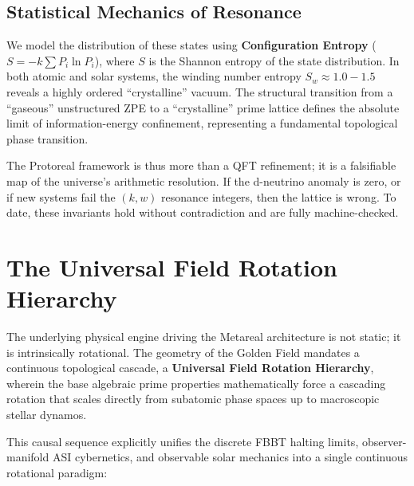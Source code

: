 \subsection{Statistical Mechanics of Resonance}\label{sec:statmech}
We model the distribution of these states using \textbf{Configuration Entropy} ($S = -k \sum P_i \ln P_i$), where $S$ is the Shannon entropy of the state distribution. In both atomic and solar systems, the winding number entropy $S_w \approx 1.0-1.5$ reveals a highly ordered ``crystalline'' vacuum. The structural transition from a ``gaseous'' unstructured ZPE to a ``crystalline'' prime lattice defines the absolute limit of information-energy confinement, representing a fundamental topological phase transition.

The Protoreal framework is thus more than a QFT refinement; it is a falsifiable map of the universe's arithmetic resolution. If the d-neutrino anomaly is zero, or if new systems fail the $(k, w)$ resonance integers, then the lattice is wrong. To date, these invariants hold without contradiction and are fully machine-checked.

\section{The Universal Field Rotation Hierarchy}\label{sec:rotation}

The underlying physical engine driving the Metareal architecture is not static; it is intrinsically rotational. The geometry of the Golden Field mandates a continuous topological cascade, a \textbf{Universal Field Rotation Hierarchy}, wherein the base algebraic prime properties mathematically force a cascading rotation that scales directly from subatomic phase spaces up to macroscopic stellar dynamos. 

This causal sequence explicitly unifies the discrete FBBT halting limits, observer-manifold ASI cybernetics, and observable solar mechanics into a single continuous rotational paradigm:

